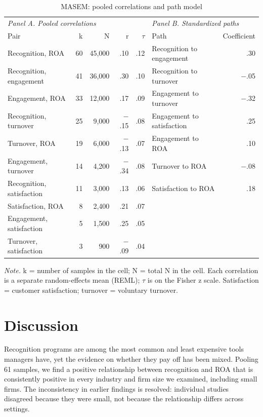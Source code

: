 \documentclass[11pt]{article}
\begin{document}
\begin{table}[H]
\centering
\small
\caption{MASEM: pooled correlations and path model}
\begin{tabular}{lrrrr@{\hspace{2.5em}}lr}
\toprule
\multicolumn{5}{l}{\textit{Panel A. Pooled correlations}} & \multicolumn{2}{l}{\textit{Panel B. Standardized paths}}\\
Pair & k & N & r & $\tau$ & Path & Coefficient \\
\midrule
Recognition, ROA & 60 & 45,000 & .10 & .12 & Recognition to engagement & .30 \\
Recognition, engagement & 41 & 36,000 & .30 & .10 & Recognition to turnover & $-$.05 \\
Engagement, ROA & 33 & 12,000 & .17 & .09 & Engagement to turnover & $-$.32 \\
Recognition, turnover & 25 & 9,000 & $-$.15 & .08 & Engagement to satisfaction & .25 \\
Turnover, ROA & 19 & 6,000 & $-$.13 & .07 & Engagement to ROA & .10 \\
Engagement, turnover & 14 & 4,200 & $-$.34 & .08 & Turnover to ROA & $-$.08 \\
Recognition, satisfaction & 11 & 3,000 & .13 & .06 & Satisfaction to ROA & .18 \\
Satisfaction, ROA & 8 & 2,400 & .21 & .07 & & \\
Engagement, satisfaction & 5 & 1,500 & .25 & .05 & & \\
Turnover, satisfaction & 3 & 900 & $-$.09 & .04 & & \\
\bottomrule
\end{tabular}

\smallskip
\parbox{0.95\textwidth}{\footnotesize\textit{Note.} k = number of samples in the cell; N = total N in the cell. Each correlation is a separate random-effects mean (REML); $\tau$ is on the Fisher z scale. Satisfaction = customer satisfaction; turnover = voluntary turnover.}
\end{table}

\section{Discussion}

Recognition programs are among the most common and least expensive tools managers have, yet the evidence on whether they pay off has been mixed. Pooling 61 samples, we find a positive relationship between recognition and ROA that is consistently positive in every industry and firm size we examined, including small firms. The inconsistency in earlier findings is resolved: individual studies disagreed because they were small, not because the relationship differs across settings.
\end{document}

